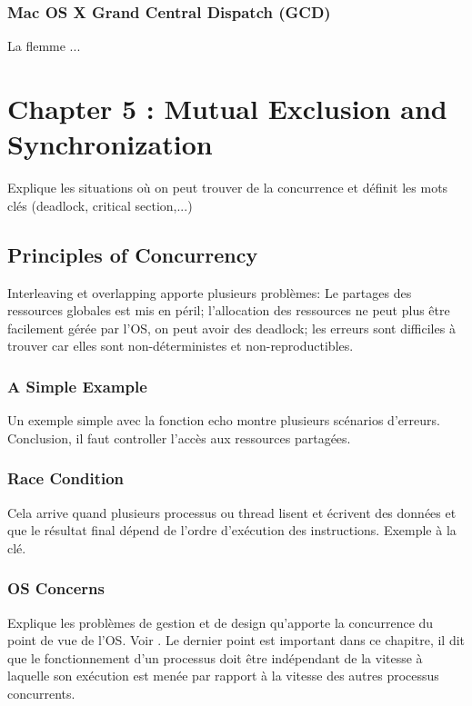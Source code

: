 \subsubsection{Mac OS X Grand Central Dispatch (GCD)}
La flemme ...

\newpage



\section{Chapter 5 : Mutual Exclusion and Synchronization}
Explique les situations où on peut trouver de la concurrence et définit les mots clés (deadlock, critical section,...)

\subsection{Principles of Concurrency}
Interleaving et overlapping apporte plusieurs problèmes: Le partages des ressources globales est mis en péril;
l'allocation des ressources ne peut plus être facilement gérée par l'OS, on peut avoir des deadlock;
les erreurs sont difficiles à trouver car elles sont non-déterministes et non-reproductibles.

\subsubsection{A Simple Example}
Un exemple simple avec la fonction echo montre plusieurs scénarios d'erreurs.
Conclusion, il faut controller l'accès aux ressources partagées.

\subsubsection{Race Condition}
Cela arrive quand plusieurs processus ou thread lisent et écrivent des données et
que le résultat final dépend de l'ordre d'exécution des instructions.
Exemple à la clé.

\subsubsection{OS Concerns}
Explique les problèmes de gestion et de design qu'apporte la concurrence du point de vue de l'OS.
Voir \cite[p.~224]{stallings}.
Le dernier point est important dans ce chapitre,
il dit que le fonctionnement d'un processus doit être indépendant de la vitesse à laquelle son exécution est menée
par rapport à la vitesse des autres processus concurrents.

